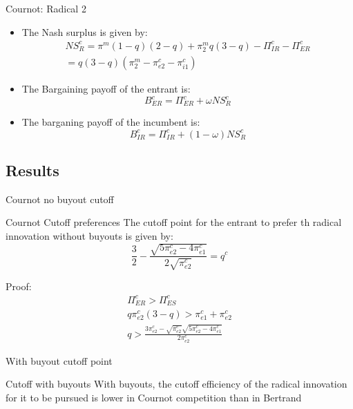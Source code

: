 \documentclass{beamer}
\begin{document}
\begin{frame}{Cournot: Radical 2}
\begin{itemize}
\item The Nash surplus is given by:
\begin{align*}
NS_{R}^{c} = \pi^{m} (1-q) (2-q)+\pi_{2}^{m} q (3-q)- \Pi_{IR}^{c} - \Pi_{ER}^{c} \\
= q(3-q) (\pi_{2}^{m}-\pi_{e2}^{c}-\pi_{i1}^{c})
\end{align*}



\item The Bargaining payoff of the entrant is: 
\begin{equation*}
B_{ER}^{c} = \Pi_{ER}^{c} + \omega NS_{R}^{c} 
\end{equation*}
    
\item The barganing payoff of the incumbent is: \begin{equation*}
B_{IR}^{c} = \Pi_{IR}^{c} + (1-\omega) NS_{R}^{c}
\end{equation*}
\end{itemize}
\end{frame}


\subsection{Results}
\begin{frame}{Cournot no buyout cutoff}
\begin{block}{Cournot Cutoff preferences}
The cutoff point for the entrant to prefer th radical innovation without buyouts is given by: 
\begin{equation*}
\frac{3}{2}-\frac{ \sqrt{5 \pi_{e2}^{c}-4 \pi_{e1}^{c}}}{2 \sqrt{\pi_{e2}^{c}}}=q^{c}
\end{equation*}
\end{block}
Proof:
\begin{align*}
\Pi_{ER}^{c}>\Pi_{ES}^{c} \\
q \pi_{e2}^{c} (3-q) > \pi_{e1}^{c}+\pi_{e2}^{c} \\
q> 
\frac{3 \pi_{e2}^{c}-\sqrt{\pi_{e2}^{c}} \sqrt{5 \pi_{e2}^{c}-4 \pi_{e1}^{c}}}{2 \pi_{e2}^{c}} 
\end{align*}
\end{frame}

\begin{frame}{With buyout cutoff point}
\begin{block}{Cutoff with buyouts}
With buyouts, the cutoff efficiency of the radical innovation for it to be pursued is lower in Cournot competition than in Bertrand
\end{block}
\end{frame}
\end{document}
